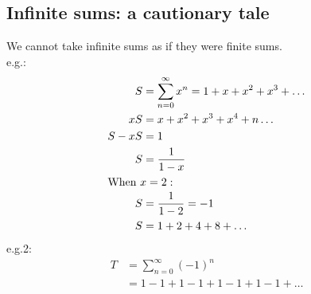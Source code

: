\documentclass[fontsize=12pt]{article}
\title{}
\author{}
\date{\today}
\newcommand {\DS} [1] {${\displaystyle #1}$}
\begin{document}
\subsection*{Infinite sums: a cautionary tale}
We cannot take infinite sums as if they were finite sums. \\
e.g.: \begin{align*}
    S      & = \sum_{n=0}^{\infty} x^n = 1 + x + x^2 + x^3 + \dots \\
    xS     & = x + x^2 + x^3 + x^4+n\dots                          \\
    S - xS & = 1                                                   \\
    S      & = \frac{1}{1-x}                                       \\
    \intertext{When \DS{ x = 2: }}
    S      & = \frac{1}{1-2} = -1                                  \\
    S      & = 1 + 2 + 4 + 8 + \dots
\end{align*}
e.g.2: \begin{align*}
    T & = \sum_{n = 0}^{\infty} (-1)^n     \\
      & = 1 -1 + 1-1 + 1 -1 + 1 -1 + \dots
\end{align*}
\end{document}
